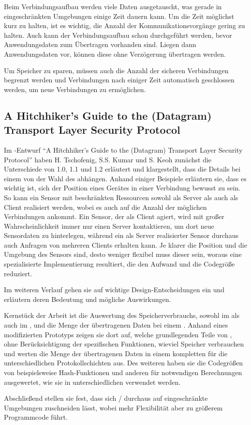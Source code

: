 Beim Verbindungsaufbau werden viele Daten ausgetauscht, was gerade in eingeschränkten Umgebungen einige Zeit dauern kann. Um die Zeit
möglichst kurz zu halten, ist es wichtig, die Anzahl der Kommunikationsvorgänge gering zu halten. Auch kann der Verbindungsaufbau schon
durchgeführt werden, bevor Anwendungsdaten zum Übertragen vorhanden sind. Liegen dann Anwendungsdaten vor, können diese ohne Verzögerung
übertragen werden.

Um Speicher zu sparen, müssen auch die Anzahl der sicheren Verbindungen begrenzt werden und Verbindungen nach einiger Zeit
automatisch geschlossen werden, um neue Verbindungen zu ermöglichen.

\subsection{A Hitchhiker's Guide to the (Datagram) Transport Layer Security Protocol}
Im -Entwurf "`A Hitchhiker's Guide to the (Datagram) Transport Layer Security Protocol"' \cite{draftmintls} haben H. Tschofenig, S.S. Kumar
und S. Keoh zunächst die Unterschiede von  1.0, 1.1 und 1.2 erläutert und klargestellt, dass die Details bei einem  von der Wahl des
 abhängen. Anhand einiger Beispiele erläutern sie, dass es wichtig ist, sich der Position eines Gerätes in einer Verbindung bewusst zu sein.
So kann ein Sensor mit beschränkten Ressourcen sowohl als Server als auch als Client realisiert werden, wobei es auch auf die Anzahl der möglichen
Verbindungen ankommt. Ein Sensor, der als Client agiert, wird mit großer Wahrscheinlichkeit immer nur einen Server kontaktieren, um dort neue Sensordaten
zu hinterlegen, während ein als Server realisierter Sensor durchaus auch Anfragen von mehreren Clients erhalten kann. Je klarer die Position und die
Umgebung des Sensors sind, desto weniger flexibel muss dieser sein, woraus eine spezialisierte Implementierung resultiert, die den Aufwand und die Codegröße reduziert.

Im weiteren Verlauf gehen sie auf wichtige Design-Entscheidungen ein und erläutern deren Bedeutung und mögliche Auswirkungen.

Kernstück der Arbeit ist die Auswertung des Speicherverbrauchs, sowohl im  als auch im , und die Menge der übertragenen Daten bei einem .
Anhand eines modifizierten Prototyps zeigen sie dort auf, welche grundlegenden Teile von , ohne Berücksichtigung der  spezifischen Funktionen,
wieviel Speicher verbrauchen und werten die Menge der übertragenen Daten in einem kompletten  für die unterschiedlichen Protokollschichten aus.
Des weiteren haben sie die Codegrößen von beispielsweise Hash-Funktionen und anderen für  notwendigen Berechnungen ausgewertet, wie sie in unterschiedlichen
 verwendet werden.

Abschließend stellen sie fest, dass sich / durchaus auf eingeschränkte Umgebungen zuschneiden lässt, wobei mehr Flexibilität aber zu
größerem Programmcode führt. 

